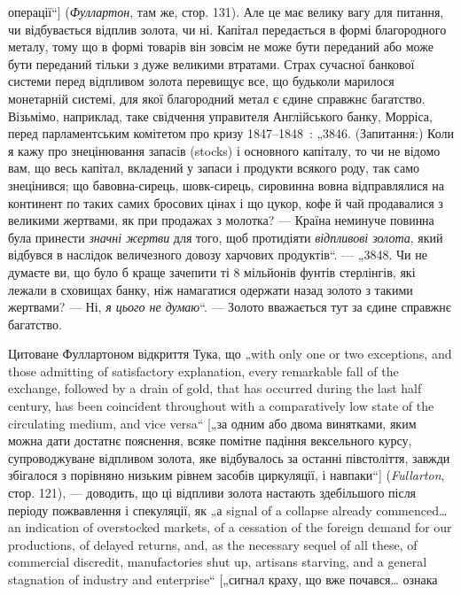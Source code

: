 операції“] (\emph{Фуллартон}, там же, стор. 131). Але це має велику
вагу для питання, чи відбувається відплив золота, чи ні. Капітал
передається в формі благородного металу, тому що в формі
товарів він зовсім не може бути переданий або може бути
переданий тільки з дуже великими втратами. Страх сучасної
банкової системи перед відпливом золота перевищує все, що
будьколи марилося монетарній системі, для якої благородний
метал є єдине справжнє багатство. Візьмімо, наприклад, таке
свідчення управителя Англійського банку, Морріса, перед парламентським
комітетом про кризу 1847--1848~: „3846. (Запитання:)
Коли я кажу про знецінювання запасів (stocks) і основного
капіталу, то чи не відомо вам, що весь капітал, вкладений у запаси
і продукти всякого роду, так само знецінився; що бавовна-сирець,
шовк-сирець, сировинна вовна відправлялися на континент
по таких самих бросових цінах і що цукор, кофе й чай продавалися
з великими жертвами, як при продажах з молотка? — Країна
неминуче повинна була принести \emph{значні жертви} для того, щоб
протидіяти \emph{відпливові золота}, який відбувся в наслідок величезного
довозу харчових продуктів“. — „3848. Чи не думаєте
ви, що було б краще зачепити ті 8 мільйонів фунтів стерлінгів, які
лежали в сховищах банку, ніж намагатися одержати назад золото
з такими жертвами? — Ні, \emph{я цього не думаю}“. — Золото вважається
тут за єдине справжнє багатство.

Цитоване Фуллартоном відкриття Тука, що „with only one
or two exceptions, and those admitting of satisfactory explanation,
every remarkable fall of the exchange, followed by a drain of gold,
that has occurred during the last half century, has been coincident
throughout with a comparatively low state of the circulating medium,
and vice versa“ [„за одним або двома винятками, яким
можна дати достатнє пояснення, всяке помітне падіння вексельного
курсу, супроводжуване відпливом золота, яке відбувалось
за останні півстоліття, завжди збігалося з порівняно низьким
рівнем засобів циркуляції, і навпаки“] (\emph{Fullarton}, стор. 121), —
доводить, що ці відпливи золота настають здебільшого після періоду
пожвавлення і спекуляції, як „а signal of a collapse already
commenced\dots{} an indication of overstocked markets, of a cessation
of the foreign demand for our productions, of delayed returns, and,
as the necessary sequel of all these, of commercial discredit, manufactories
shut up, artisans starving, and a general stagnation of
industry and enterprise“ [„сигнал краху, що вже почався\dots{} ознака
\parbreak{}  %
